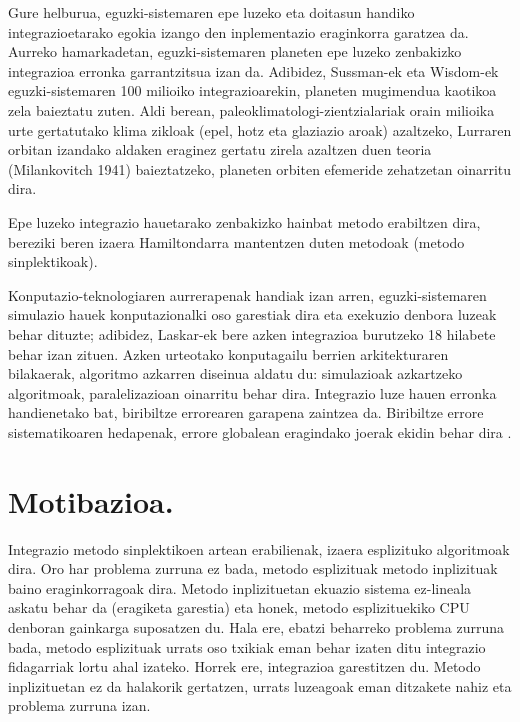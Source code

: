 Gure helburua, eguzki-sistemaren epe luzeko eta doitasun handiko integrazioetarako egokia izango den inplementazio eraginkorra garatzea da. Aurreko hamarkadetan, eguzki-sistemaren planeten epe luzeko zenbakizko integrazioa erronka garrantzitsua izan da. Adibidez, Sussman-ek eta Wisdom-ek  eguzki-sistemaren 100 milioiko integrazioarekin, planeten mugimendua kaotikoa zela baieztatu zuten. Aldi berean, paleoklimatologi-zientzialariak orain milioika urte gertatutako klima zikloak (epel, hotz eta glaziazio aroak) azaltzeko, Lurraren orbitan izandako aldaken eraginez gertatu zirela azaltzen duen teoria (Milankovitch 1941) \cite{Berger2012} baieztatzeko, planeten orbiten efemeride zehatzetan oinarritu dira.        

Epe luzeko integrazio hauetarako zenbakizko hainbat metodo erabiltzen dira, bereziki beren izaera Hamiltondarra mantentzen duten metodoak (metodo sinplektikoak).

Konputazio-teknologiaren aurrerapenak handiak izan arren, eguzki-sistemaren simulazio hauek konputazionalki oso garestiak dira eta exekuzio denbora luzeak behar dituzte; adibidez, Laskar-ek  bere azken integrazioa burutzeko 18 hilabete behar izan zituen.
Azken urteotako konputagailu berrien arkitekturaren bilakaerak, algoritmo azkarren diseinua aldatu du: simulazioak azkartzeko algoritmoak, paralelizazioan oinarritu behar dira. Integrazio luze hauen erronka handienetako bat, biribiltze errorearen garapena zaintzea da. Biribiltze errore sistematikoaren hedapenak, errore globalean eragindako joerak ekidin behar dira \cite{Laskar2015}.
 
\section{Motibazioa.}
\label{intro}


Integrazio metodo sinplektikoen artean erabilienak, izaera esplizituko algoritmoak dira. Oro har problema zurruna ez bada, metodo esplizituak  metodo inplizituak baino eraginkorragoak dira. Metodo inplizituetan ekuazio sistema ez-lineala askatu behar da (eragiketa garestia) eta honek, metodo esplizituekiko CPU denboran gainkarga suposatzen du. Hala ere, ebatzi beharreko problema zurruna bada, metodo esplizituak urrats oso txikiak eman behar izaten ditu integrazio fidagarriak lortu ahal izateko. Horrek ere, integrazioa garestitzen du. Metodo inplizituetan ez da halakorik gertatzen, urrats luzeagoak eman ditzakete nahiz eta problema zurruna izan. 

